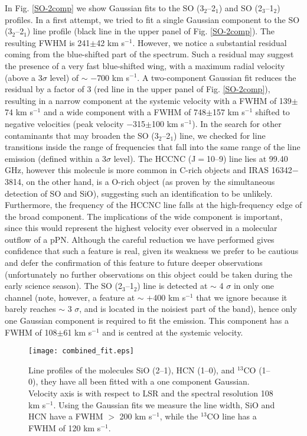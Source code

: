 \documentclass[a4paper,fleqn,usenatbib]{mnras}
\begin{document}
In Fig. \ref{SO-2comp} we show Gaussian fits to the SO (3$_2$--2$_1$) and SO (2$_3$--1$_2$) profiles. In a first attempt, we tried to fit a single Gaussian component to the SO (3$_2$--2$_1$) line profile (black line in the upper panel of Fig. \ref{SO-2comp}). The resulting FWHM is 241$\pm$42 km s$^{-1}$. However, we notice a substantial residual coming from the blue-shifted part of the spectrum. Such a residual may suggest the presence of a very fast blue-shifted wing, with a maximum radial velocity (above a 3$\sigma$ level) of $\sim$ $-$700 km s$^{-1}$. A two-component Gaussian fit reduces the residual by a factor of 3 (red line in the upper panel of Fig. \ref{SO-2comp}), resulting in a narrow component at the systemic velocity with a FWHM of 139$\pm$74 km s$^{-1}$ and a wide component with a FWHM of 748$\pm$157 km s$^{-1}$ shifted to negative velocities (peak velocity $-$315$\pm$100 km s$^{-1}$). In the search for other contaminants that may broaden the SO (3$_2$--2$_1$) line, we checked for line transitions inside the range of frequencies that fall into the same range of the line emission (defined within a 3$\sigma$ level). The HCCNC (J$=$10--9) line lies at 99.40 GHz, however this molecule is more common in C-rich objects and IRAS 16342$-$3814, on the other hand, is a O-rich object (as proven by the simultaneous detection of SO and SiO), suggesting such an identification to be unlikely. Furthermore, the frequency of the HCCNC line falls at the high-frequency edge of the broad component. The implications of the wide component is important, since this would represent the highest velocity ever observed in a molecular outflow of a pPN. Although the careful reduction we have performed gives confidence that such a feature is real, given its weakness we prefer to be cautious and defer the confirmation of this feature to future deeper observations (unfortunately no further observations on this object could be taken during the early science season). The SO (2$_3$--1$_2$) line is detected at $\sim$ 4 $\sigma$ in only one channel (note, however, a feature at $\sim$ $+$400 km s$^{-1}$ that we ignore because it barely reaches $\sim$ 3 $\sigma$, and is located in the noisiest part of the band), hence only one Gaussian component is required to fit the emission. This component has a FWHM of 108$\pm$61 km s$^{-1}$ and is centred at the systemic velocity. 

\begin{figure} 
\centering
\texttt{[image: combined\_fit.eps]}
\caption{Line profiles of the molecules SiO (2--1), HCN (1--0), and $^{13}$CO (1--0), they have all been fitted with a one component Gaussian. Velocity axis is with respect to LSR and the spectral resolution 108 km s$^{-1}$. Using the Gaussian fits we measure the line width, SiO and HCN have a FWHM $>$ 200 km s$^{-1}$, while the $^{13}$CO line has a FWHM of 120 km s$^{-1}$. }
\label{other_lines}
\end{figure}
\end{document}
